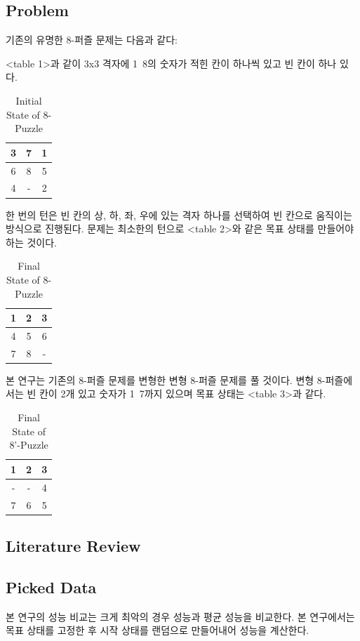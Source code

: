 \documentclass{sig-alternate-05-2015}
\begin{document}
\begin{CJK}{UTF8}{mj}
\subsection{Problem}
기존의 유명한 8-퍼즐 문제는 다음과 같다:

<table 1>과 같이 3x3 격자에 1~8의 숫자가 적힌 칸이 하나씩 있고 빈 칸이 하나 있다.
\begin{table}
\centering
\caption{Initial State of 8-Puzzle}
\begin{tabular}{|c|c|c|} \hline
3 & 7 & 1 \\ \hline
6 & 8 & 5 \\ \hline
4 & - & 2 \\ 
\hline\end{tabular}
\end{table}

한 번의 턴은 빈 칸의 상, 하, 좌, 우에 있는 격자 하나를 선택하여 빈 칸으로 움직이는 방식으로 진행된다. 문제는 최소한의 턴으로 <table 2>와 같은 목표 상태를 만들어야 하는 것이다.
\begin{table}
\centering
\caption{Final State of 8-Puzzle}
\begin{tabular}{|c|c|c|} \hline
1 & 2 & 3 \\ \hline
4 & 5 & 6 \\ \hline
7 & 8 & - \\ 
\hline\end{tabular}
\end{table}

본 연구는 기존의 8-퍼즐 문제를 변형한 변형 8-퍼즐 문제를 풀 것이다. 변형 8-퍼즐에서는 빈 칸이 2개 있고 숫자가 1~7까지 있으며 목표 상태는 <table 3>과 같다.
\begin{table}
\centering
\caption{Final State of 8'-Puzzle}
\begin{tabular}{|c|c|c|} \hline
1 & 2 & 3 \\ \hline
- & - & 4 \\ \hline
7 & 6 & 5 \\ 
\hline\end{tabular}
\end{table}
\subsection{Literature Review}
\subsection{Picked Data}
본 연구의 성능 비교는 크게 최악의 경우 성능과 평균 성능을 비교한다. 본 연구에서는 목표 상태를 고정한 후 시작 상태를 랜덤으로 만들어내어 성능을 계산한다.


\end{CJK}
\end{document}
